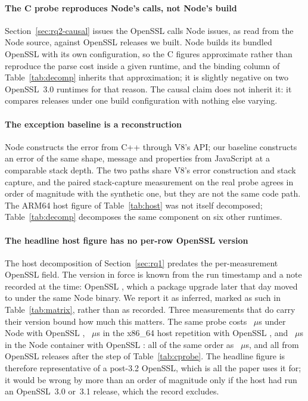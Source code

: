 \documentclass[preprint,12pt,authoryear]{elsarticle}
\begin{document}
\paragraph{The C probe reproduces Node's calls, not Node's build}
Section~\ref{sec:rq2-causal} issues the OpenSSL calls Node issues, as read from
the Node source, against OpenSSL releases we built. Node builds its bundled
OpenSSL with its own configuration, so the C figures approximate rather than
reproduce the parse cost inside a given runtime, and the binding column of
Table~\ref{tab:decomp} inherits that approximation; it is slightly negative
on two OpenSSL~3.0 runtimes for that reason. The causal claim does not inherit
it: it compares releases under one build configuration with nothing else
varying.

\paragraph{The exception baseline is a reconstruction} Node constructs the
error from C++ through V8's API; our baseline constructs an error of the same
shape, message and properties from JavaScript at a comparable stack depth. The
two paths share V8's error construction and stack capture, and the paired
stack-capture measurement on the real probe agrees in order of magnitude with
the synthetic one, but they are not the same code path. The ARM64 host figure
of Table~\ref{tab:host} was not itself decomposed; Table~\ref{tab:decomp}
decomposes the same component on six other runtimes.

\paragraph{The headline host figure has no per-row OpenSSL version} The host
decomposition of Section~\ref{sec:rq1} predates the per-measurement OpenSSL
field. The version in force is known from the run timestamp and a note recorded
at the time: OpenSSL \HostOpensslInferred, which a package upgrade later that
day moved to \HostOpensslAfterDrift{} under the same Node binary. We report it
as inferred, marked as such in Table~\ref{tab:matrix}, rather than as recorded.
Three measurements that do carry their version bound how much this matters.
The same probe costs \RtTwentySixProbe~$\mu$s under Node \RtTwentySixLiteral{}
with OpenSSL \RtTwentySixOpenssl, \XhProbeThrows~$\mu$s in the x86\_64 host
repetition with OpenSSL \XhOpenssl, and \NodeTwentySixGlibcProbeThrows~$\mu$s in
the Node \NodeTwentySixGlibcNodeMajor{} container with OpenSSL
\NodeTwentySixGlibcOpensslLiteral{}: all of the same order as
\HostProbeThrows~$\mu$s, and all from OpenSSL releases after the step of
Table~\ref{tab:cprobe}. The headline figure is therefore representative of a
post-3.2 OpenSSL, which is all the paper uses it for; it would be wrong by more
than an order of magnitude only if the host had run an OpenSSL~3.0 or~3.1
release, which the record excludes.
\end{document}
